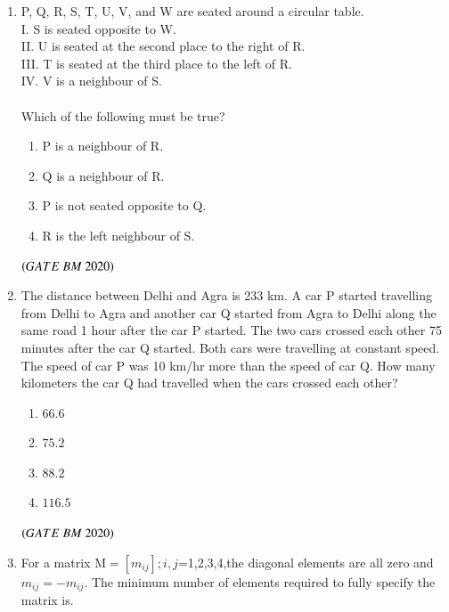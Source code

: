 \documentclass[journal,12pt,onecolumn]{IEEEtran}
\theoremstyle{remark}
\begin{document}
\begin{enumerate}
\item P, Q, R, S, T, U, V, and W are seated around a circular table.\\
      I. S is seated opposite to W.\\
      II. U is seated at the second place to the right of R.\\
      III. T is seated at the third place to the left of R.\\
      IV. V is a neighbour of S.\\
  \\Which of the following must be true?
\begin{enumerate}
    \item \hspace{0.5cm}P is a neighbour of R.
    \item \hspace{0.5cm}Q is a neighbour of R.
    \item \hspace{0.5cm}P is not seated opposite to Q.
    \item \hspace{0.5cm}R is the left neighbour of S.\\
    \end{enumerate}
\hfill $\brak{GATE\ BM\ 2020}$\\

\item The distance between Delhi and Agra is 233 km. A car P started travelling from Delhi to Agra and another car Q started from Agra to Delhi along the same road 1 hour after the car P started. The two cars crossed each other 75 minutes after the car Q started. Both cars were travelling at constant speed. The speed of car P was 10 km/hr more than the speed of car Q. How many kilometers the car Q had travelled when the cars crossed each other?
\begin{enumerate}
    \item \hspace{0.5cm}$66.6$
    \item \hspace{0.5cm}$75.2$
    \item \hspace{0.5cm}$88.2$
    \item \hspace{0.5cm}$116.5$\\
    \end{enumerate}
\hfill $\brak{GATE\ BM\ 2020}$\\

\item  For a matrix M$=$${[m_{ij}]}$$;i,j$=1,2,3,4,the diagonal elements are all zero and ${m_{ij}}=-$${m_{ij}}$. The minimum number of elements required to fully specify the matrix is\underline{\hspace{2cm}}.


\end{enumerate}
\end{document}
